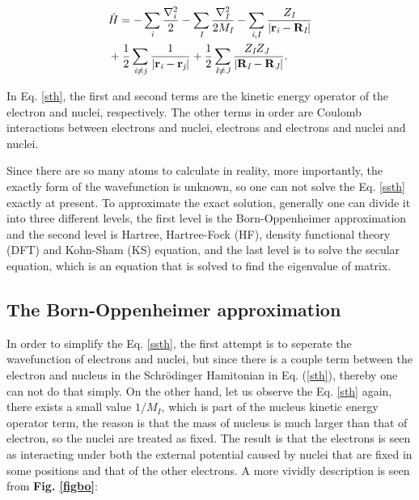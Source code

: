 \documentclass[a4paper, 12pt, titlepage,oneside,drop]{kthesis}
\begin{document}
\begin{equation}\label{sth}\begin{split}
&\hath = - \sumi<i>   \frac{{{\nabla}_{\textit{i}}^{2}}}{2} - \sumi<I> \frac{{{\nabla}_{\textit{I}}^{2}}}{2 M_\textit{I}}  - \sumij<i><I> \frac{Z_\textit{I}}{|\textbf{r}_\textit{i}-\textbf{R}_\textit{I}|} \\
& + \frac{1}{2} \suminj<i><j> \frac{1}{ |\textbf{r}_\textit{i}-\textbf{r}_\textit{j}|} + \frac{1}{2} \suminj<I><J> \frac{Z_\textit{I} Z_\textit{J}\ }{|\textbf{R}_\textit{I}-\textbf{R}_\textit{J}|}.
\end{split}\end{equation}

In Eq. \ref{sth}, the first and second terms are the kinetic energy operator of the electron and nuclei, respectively.
The other terms in order are Coulomb interactions between electrons and nuclei, electrons and electrons and nuclei and nuclei.

Since there are so many atoms to calculate in reality, more importantly, the exactly form of the wavefunction is unknown,
so one can not solve the Eq. \ref{ssth} exactly at present. To approximate the exact solution, 
generally one can divide it into three different levels, the first level is the Born-Oppenheimer approximation and the second level is Hartree,
Hartree-Fock (HF), density functional theory (DFT) and Kohn-Sham (KS) equation, and the last level is to solve the secular equation, 
which is an equation that is solved to find the eigenvalue of matrix.

\subsection{The Born-Oppenheimer approximation}
\label{ch:boa}

In order to simplify the Eq. \ref{ssth}, the first attempt is to seperate the wavefunction of electrons and nuclei, but since there is a couple term between the electron and nucleus in the Schrödinger Hamitonian in Eq. (\ref{sth}), 
thereby one can not do that simply. On the other hand, let us observe the Eq. \ref{sth} again, there exists a small value ${1}/{M_I}$, which is part of the nucleus kinetic energy
operator term, the reason is that the mass of nucleus is much larger than that of electron, so the nuclei are treated as fixed. The result is that the electrons is seen as interacting under both the external potential caused by nuclei that are fixed in 
some positions and that of the other electrons. A more vividly description is seen from \textbf{Fig. \ref{figbo}}:
\end{document}
